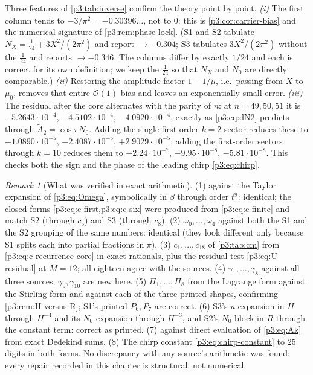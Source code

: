 \documentclass[11pt,a4paper,oneside]{book}
\theoremstyle{plain}
\theoremstyle{definition}
\theoremstyle{remark}
\newtheorem{remark}[theorem]{Remark}
\newcommand{\bigO}{\mathcal{O}}
\begin{document}
Three features of \cref{p3:tab:inverse} confirm the theory point by point. \emph{(i)} The first
column tends to $-3/\pi^{2}=-0.30396\ldots$, not to $0$: this is \cref{p3:cor:carrier-bias} and
the numerical signature of \cref{p3:rem:phase-lock}. (S1 and S2 tabulate
$N_{X}=\tfrac1{24}+3X^{2}/(2\pi^{2})$ and report $\to-0.304$; S3 tabulates $3X^{2}/(2\pi^{2})$
without the $\tfrac1{24}$ and reports $\to-0.346$. The columns differ by exactly $1/24$ and each
is correct for its own definition; we keep the $\tfrac1{24}$ so that $N_{X}$ and $N_{0}$ are
directly comparable.) \emph{(ii)} Restoring the amplitude factor $1-1/\mu$, i.e.\ passing from $X$
to $\mu_{0}$, removes that entire $\bigO(1)$ bias and leaves an exponentially small error.
\emph{(iii)} The residual after the core alternates with the parity of $n$: at $n=49,50,51$ it is
$-5.2643\cdot10^{-4}$, $+4.5102\cdot10^{-4}$, $-4.0920\cdot10^{-4}$, exactly as \cref{p3:eq:dN2}
predicts through $\widetilde A_{2}=\cos\pi N_{0}$. Adding the single first-order $k=2$ sector
reduces these to $-1.0890\cdot10^{-5}$, $-2.4087\cdot10^{-5}$, $+2.9029\cdot10^{-5}$; adding the
first-order sectors through $k=10$ reduces them to $-2.24\cdot10^{-7}$, $-9.95\cdot10^{-8}$,
$-5.81\cdot10^{-8}$. This checks both the sign and the phase of the leading chirp
\cref{p3:eq:chirp}.

\begin{remark}[What was verified in exact arithmetic]\label{p3:rem:symbolic-checks}
(1)  against the Taylor expansion of \cref{p3:eq:Omega}, symbolically in
$\beta$ through order $t^{9}$: identical; the closed forms \cref{p3:eq:c-first,p3:eq:c-six} were
produced from \cref{p3:eq:c-finite} and match S2 (through $c_{5}$) and S3 (through $c_{8}$). (2)
$\omega_{0},\dots,\omega_{4}$ against both the S1 and the S2 grouping of the same numbers:
identical (they look different only because S1 splits each into partial fractions in $\pi$). (3)
$c_{1},\dots,c_{18}$ of \cref{p3:tab:cm} from \cref{p3:eq:c-recurrence-core} in exact rationals,
plus the residual test \cref{p3:eq:U-residual} at $M=12$; all eighteen agree with the sources. (4)
$\gamma_{1},\dots,\gamma_{8}$ against all three sources; $\gamma_{9},\gamma_{10}$ are new here.
(5) $\Pi_{1},\dots,\Pi_{8}$ from the Lagrange form against the Stirling form and against each of
the three printed shapes, confirming \cref{p3:rem:H-versus-R}; S1's printed $P_{6},P_{7}$ are
correct. (6) S3's $u$-expansion in $H$ through $H^{-4}$ and its $N_{0}$-expansion through
$H^{-3}$, and S2's $N_{0}$-block in $R$ through the constant term: correct as printed. (7)
 against direct evaluation of \cref{p3:eq:Ak} from exact Dedekind sums. (8)
The chirp constant \cref{p3:eq:chirp-constant} to $25$ digits in both forms. No discrepancy with
any source's arithmetic was found: every repair recorded in this chapter is structural, not
numerical.
\end{remark}
\end{document}
